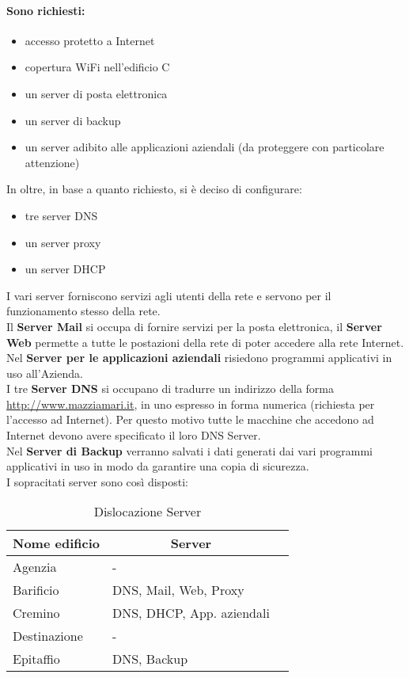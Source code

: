 \documentclass[a4paper,11pt]{article}
\begin{document}
\paragraph{Sono richiesti:} 
\begin{itemize}
\item accesso protetto a Internet
\item copertura WiFi nell'edificio C
\item un server di posta elettronica
\item un server di backup 
\item un server adibito alle applicazioni aziendali (da proteggere con particolare attenzione)
\end{itemize}
In oltre, in base a quanto richiesto, si è deciso di configurare:
\begin{itemize}
\item tre server DNS
\item un server proxy 
\item un server DHCP
\end{itemize}
I vari server forniscono servizi agli utenti della rete e servono per il funzionamento stesso della rete.\\
Il \textbf{Server Mail} si occupa di fornire servizi per la posta elettronica, il \textbf{Server Web} permette a tutte le postazioni della rete di poter accedere alla rete Internet.\\
Nel \textbf{Server per le applicazioni aziendali} risiedono programmi applicativi in uso all’Azienda.\\
I tre \textbf{Server DNS} si occupano di tradurre un indirizzo della forma \url{http://www.mazziamari.it}, in uno espresso in forma numerica (richiesta per l’accesso ad Internet). Per questo motivo tutte le macchine che accedono ad Internet devono avere specificato il loro DNS Server.\\
Nel \textbf{Server di Backup} verranno salvati i dati generati dai vari programmi applicativi in uso in modo da garantire una copia di sicurezza.\\
I sopracitati server sono così disposti:
\begin{table}[H]
\centering
\label{riepilogo}
\begin{tabular}{|l|l|l|}
\hline
\multicolumn{1}{|c|}{\textbf{Nome edificio}} & \multicolumn{1}{c|}{\textbf{Server}} \\ \hline
Agenzia & - \\ \hline
Barificio & DNS, Mail, Web, Proxy \\ \hline
Cremino & DNS, DHCP, App. aziendali \\ \hline
Destinazione & - \\ \hline
Epitaffio & DNS, Backup \\ \hline
\end{tabular}
\caption{Dislocazione Server}
\end{table}
\newpage
\end{document}

